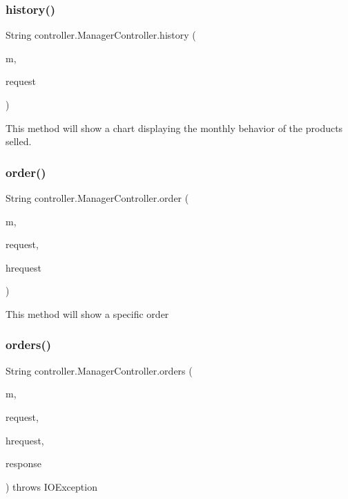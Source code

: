 \subsubsection{\texorpdfstring{history()}{history()}}
{\footnotesize\ttfamily String controller.\+Manager\+Controller.\+history (\begin{DoxyParamCaption}\item[{Model}]{m,  }\item[{Web\+Request}]{request }\end{DoxyParamCaption})\hspace{0.3cm}{\ttfamily [inline]}}

This method will show a chart displaying the monthly behavior of the products selled. \mbox{\label{classcontroller_1_1_manager_controller_a32dde55b16d1fb8e38f0a4f1cc0351be}} 
\subsubsection{\texorpdfstring{order()}{order()}}
{\footnotesize\ttfamily String controller.\+Manager\+Controller.\+order (\begin{DoxyParamCaption}\item[{Model}]{m,  }\item[{Web\+Request}]{request,  }\item[{Http\+Servlet\+Request}]{hrequest }\end{DoxyParamCaption})\hspace{0.3cm}{\ttfamily [inline]}}

This method will show a specific order \mbox{\label{classcontroller_1_1_manager_controller_a59689dd37c44b3294edc931668e57fb0}} 
\subsubsection{\texorpdfstring{orders()}{orders()}}
{\footnotesize\ttfamily String controller.\+Manager\+Controller.\+orders (\begin{DoxyParamCaption}\item[{Model}]{m,  }\item[{Web\+Request}]{request,  }\item[{Http\+Servlet\+Request}]{hrequest,  }\item[{Http\+Servlet\+Response}]{response }\end{DoxyParamCaption}) throws I\+O\+Exception\hspace{0.3cm}{\ttfamily [inline]}}

